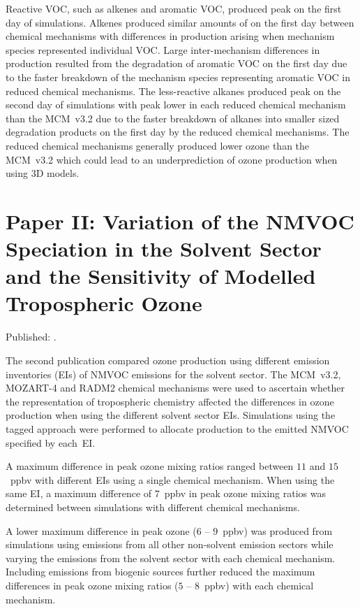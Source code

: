 Reactive VOC, such as alkenes and aromatic VOC, produced peak  on the first day of simulations.
Alkenes produced similar amounts of  on the first day between chemical mechanisms with differences in  production arising when mechanism species represented individual VOC.
Large inter-mechanism differences in  production resulted from the degradation of aromatic VOC on the first day due to the faster breakdown of the mechanism species representing aromatic VOC in reduced chemical mechanisms.
The less-reactive alkanes produced peak  on the second day of simulations with peak  lower in each reduced chemical mechanism than the MCM~v3.2 due to the faster breakdown of alkanes into smaller sized degradation products on the first day by the reduced chemical mechanisms.
The reduced chemical mechanisms generally produced lower ozone than the MCM~v3.2 which could lead to an underprediction of ozone production when using 3D models.

\newpage
\singlespacing
\section{Paper II: Variation of the NMVOC Speciation in the Solvent Sector and the Sensitivity of Modelled Tropospheric Ozone} \label{s:EI_results}
\onehalfspacing

\vspace{-6mm}
\noindent
Published: .
\vspace{5mm}

The second publication compared ozone production using different emission inventories (EIs) of NMVOC emissions for the solvent sector.
The MCM~v3.2, MOZART-4 and RADM2 chemical mechanisms were used to ascertain whether the representation of tropospheric chemistry affected the differences in ozone production when using the different solvent sector EIs.
Simulations using the tagged approach were performed to allocate  production to the emitted NMVOC specified by each~EI.

A maximum difference in peak ozone mixing ratios ranged between $11$ and $15$~ppbv with different EIs using a single chemical mechanism.
When using the same EI, a maximum difference of $7$~ppbv in peak ozone mixing ratios was determined between simulations with different chemical mechanisms.

A lower maximum difference in peak ozone ($6$ -- $9$~ppbv) was produced from simulations using emissions from all other non-solvent emission sectors while varying the emissions from the solvent sector with each chemical mechanism.
Including emissions from biogenic sources further reduced the maximum differences in peak ozone mixing ratios ($5$ -- $8$~ppbv) with each chemical mechanism.

